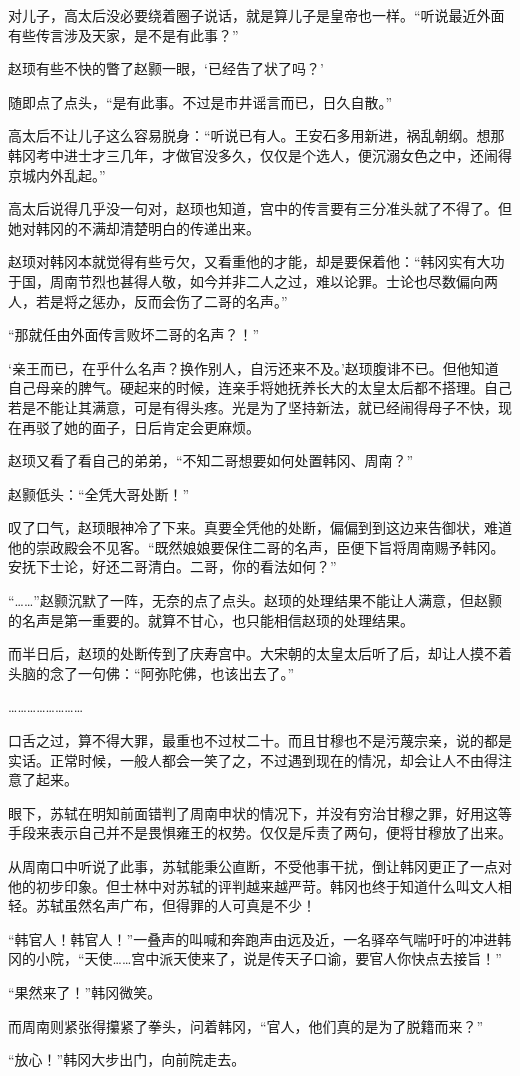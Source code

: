 对儿子，高太后没必要绕着圈子说话，就是算儿子是皇帝也一样。“听说最近外面有些传言涉及天家，是不是有此事？”

赵顼有些不快的瞥了赵颢一眼，‘已经告了状了吗？’

随即点了点头，“是有此事。不过是市井谣言而已，日久自散。”

高太后不让儿子这么容易脱身：“听说已有人。王安石多用新进，祸乱朝纲。想那韩冈考中进士才三几年，才做官没多久，仅仅是个选人，便沉溺女色之中，还闹得京城内外乱起。”

高太后说得几乎没一句对，赵顼也知道，宫中的传言要有三分准头就了不得了。但她对韩冈的不满却清楚明白的传递出来。

赵顼对韩冈本就觉得有些亏欠，又看重他的才能，却是要保着他：“韩冈实有大功于国，周南节烈也甚得人敬，如今并非二人之过，难以论罪。士论也尽数偏向两人，若是将之惩办，反而会伤了二哥的名声。”

“那就任由外面传言败坏二哥的名声？！”

‘亲王而已，在乎什么名声？换作别人，自污还来不及。’赵顼腹诽不已。但他知道自己母亲的脾气。硬起来的时候，连亲手将她抚养长大的太皇太后都不搭理。自己若是不能让其满意，可是有得头疼。光是为了坚持新法，就已经闹得母子不快，现在再驳了她的面子，日后肯定会更麻烦。

赵顼又看了看自己的弟弟，“不知二哥想要如何处置韩冈、周南？”

赵颢低头：“全凭大哥处断！”

叹了口气，赵顼眼神冷了下来。真要全凭他的处断，偏偏到到这边来告御状，难道他的崇政殿会不见客。“既然娘娘要保住二哥的名声，臣便下旨将周南赐予韩冈。安抚下士论，好还二哥清白。二哥，你的看法如何？”

“……”赵颢沉默了一阵，无奈的点了点头。赵顼的处理结果不能让人满意，但赵颢的名声是第一重要的。就算不甘心，也只能相信赵顼的处理结果。

而半日后，赵顼的处断传到了庆寿宫中。大宋朝的太皇太后听了后，却让人摸不着头脑的念了一句佛：“阿弥陀佛，也该出去了。”

……………………

口舌之过，算不得大罪，最重也不过杖二十。而且甘穆也不是污蔑宗亲，说的都是实话。正常时候，一般人都会一笑了之，不过遇到现在的情况，却会让人不由得注意了起来。

眼下，苏轼在明知前面错判了周南申状的情况下，并没有穷治甘穆之罪，好用这等手段来表示自己并不是畏惧雍王的权势。仅仅是斥责了两句，便将甘穆放了出来。

从周南口中听说了此事，苏轼能秉公直断，不受他事干扰，倒让韩冈更正了一点对他的初步印象。但士林中对苏轼的评判越来越严苛。韩冈也终于知道什么叫文人相轻。苏轼虽然名声广布，但得罪的人可真是不少！

“韩官人！韩官人！”一叠声的叫喊和奔跑声由远及近，一名驿卒气喘吁吁的冲进韩冈的小院，“天使……宫中派天使来了，说是传天子口谕，要官人你快点去接旨！”

“果然来了！”韩冈微笑。

而周南则紧张得攥紧了拳头，问着韩冈，“官人，他们真的是为了脱籍而来？”

“放心！”韩冈大步出门，向前院走去。


